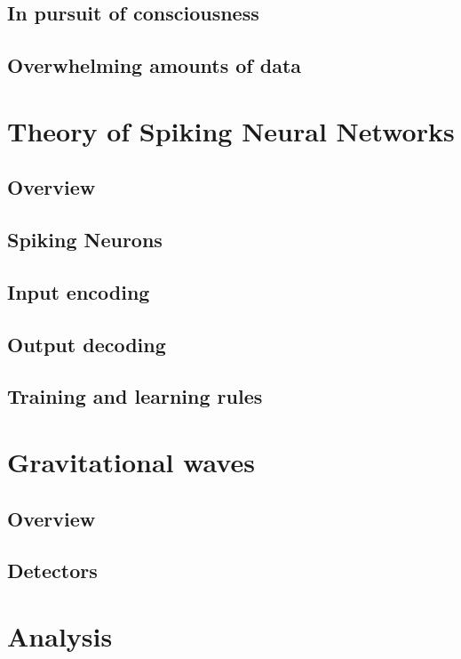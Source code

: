 \documentclass{pracalicmgr2021}
\begin{document}
    \section{In pursuit of consciousness}
    
    \section{Overwhelming amounts of data}
    
    
    \chapter{Theory of Spiking Neural Networks}
    \section{Overview}
    
    \section{Spiking Neurons}
    
    \section{Input encoding}
    
    \section{Output decoding}
    
    \section{Training and learning rules}
    
    
    \chapter{Gravitational waves}
    \section{Overview}
    
    \section{Detectors}
    
    
    \chapter{Analysis}
\end{document}
